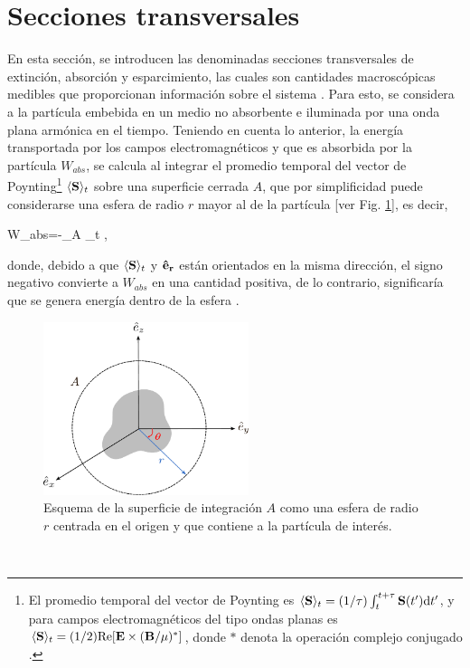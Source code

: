 

\section{Secciones transversales}
\label{section:yth}


 En esta sección, se introducen las denominadas secciones transversales de extinción, absorción y esparcimiento, las cuales son cantidades macroscópicas medibles que proporcionan información sobre el sistema \cite{bohrenAbsorptionScatteringLight2008}. Para esto, se considera a la partícula embebida en un medio no absorbente e iluminada por una onda plana armónica en el tiempo. Teniendo en cuenta lo anterior, la energía transportada por los campos electromagnéticos y que es absorbida por la partícula $W_{abs}$, se calcula al integrar el promedio temporal del vector de Poynting\footnote{El promedio temporal del vector de Poynting es $\langle\vb{S}\rangle_t = (1/\tau)\int_t^{t+\tau}\vb{S}(t')\text{d}t'$, y para campos electromagnéticos del tipo ondas planas es $\langle\vb{S}\rangle_t = (1/2) \text{Re}[\vb{E} \times (\vb{B}/\mu)^{*}]$, donde $*$ denota la operación complejo conjugado \cite{bohrenAbsorptionScatteringLight2008}. } $\langle\vb{S}\rangle_t$  sobre una superficie cerrada $A$, que por simplificidad puede considerarse una esfera de radio $r$ mayor al de la partícula [ver Fig. \ref{WA}], es decir, 
\begin{tcolorbox}
	W_{abs}=-\int_A \langle{}\rangle_t\cdot{} ,
	\label{flujopoynting}
\end{tcolorbox}
donde, debido a que $\langle\vb{S}\rangle_t$ y $\vb{\hat{e}_r}$ están orientados en la misma dirección, el signo negativo convierte a $W_{abs}$ en una cantidad positiva, de lo contrario, significaría que se genera energía dentro de la esfera \cite{bohrenAbsorptionScatteringLight2008}.
%
\begin{figure}[h]
	\centering
	\includegraphics[width=6cm]{../../Figuras/WA.pdf}
	\caption{Esquema de la superficie de integración $A$ como una esfera de radio $r$ centrada en el origen y que contiene a la partícula de interés.}
	\label{WA}
\end{figure}
\\

